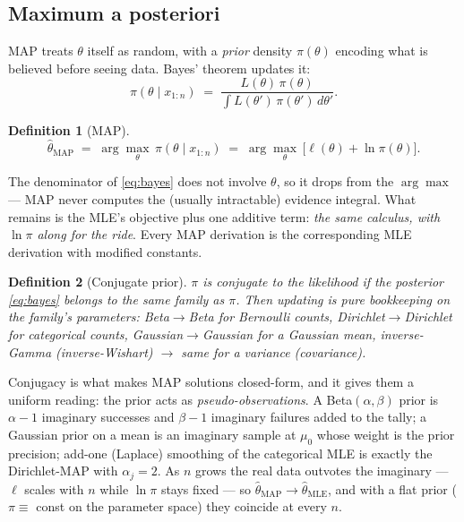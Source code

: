 \documentclass[11pt]{article}
\newtheorem{definition}{Definition}
\begin{document}
\subsection{Maximum a posteriori}

MAP treats $\theta$ itself as random, with a \emph{prior} density
$\pi(\theta)$ encoding what is believed before seeing data. Bayes'
theorem updates it:
\begin{equation}
  \pi(\theta \mid x_{1:n})
  \;=\; \frac{L(\theta)\,\pi(\theta)}
             {\int L(\theta')\,\pi(\theta')\,d\theta'} .
  \label{eq:bayes}
\end{equation}

\begin{definition}[MAP]
\begin{equation}
  \hat\theta_{\mathrm{MAP}}
  \;=\; \arg\max_{\theta}\, \pi(\theta \mid x_{1:n})
  \;=\; \arg\max_{\theta}\,\bigl[\ell(\theta) + \ln \pi(\theta)\bigr].
  \label{eq:mapdef}
\end{equation}
\end{definition}
The denominator of \eqref{eq:bayes} does not involve $\theta$, so it
drops from the $\arg\max$ --- MAP never computes the (usually
intractable) evidence integral. What remains is the MLE's objective
plus one additive term: \emph{the same calculus, with $\ln\pi$ along
for the ride}. Every MAP derivation is the corresponding MLE derivation
with modified constants.

\begin{definition}[Conjugate prior]
$\pi$ is \emph{conjugate} to the likelihood if the posterior
\eqref{eq:bayes} belongs to the same family as $\pi$. Then updating is
pure bookkeeping on the family's parameters:
Beta$\to$Beta for Bernoulli counts, Dirichlet$\to$Dirichlet for
categorical counts, Gaussian$\to$Gaussian for a Gaussian mean,
inverse-Gamma (inverse-Wishart) $\to$ same for a variance (covariance).
\end{definition}

Conjugacy is what makes MAP solutions closed-form, and it gives them a
uniform reading: the prior acts as \emph{pseudo-observations}. A
Beta$(\alpha,\beta)$ prior is $\alpha{-}1$ imaginary successes and
$\beta{-}1$ imaginary failures added to the tally; a Gaussian prior on
a mean is an imaginary sample at $\mu_0$ whose weight is the prior
precision; add-one (Laplace) smoothing of the categorical MLE is
exactly the Dirichlet-MAP with $\alpha_j = 2$. As $n$ grows the real
data outvotes the imaginary --- $\ell$ scales with $n$ while $\ln\pi$
stays fixed --- so
$\hat\theta_{\mathrm{MAP}} \to \hat\theta_{\mathrm{MLE}}$, and with a
flat prior ($\pi \equiv$ const on the parameter space) they coincide at
every $n$.
\end{document}
